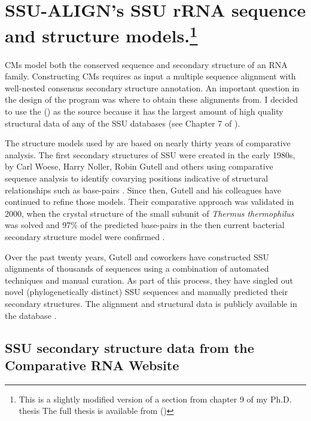 \section[SSU-ALIGN's SSU rRNA sequence and structure
  models]{SSU-ALIGN's SSU rRNA sequence and structure
  models.\footnote{This is a slightly modified version 
  of a section from chapter 9 of my Ph.D. thesis \cite{Nawrocki09b}
  The full thesis is available from
  ()}}
\label{sec:models}

CMs model both the conserved sequence and secondary structure of an
RNA family. Constructing CMs requires as input a multiple sequence
alignment with well-nested consensus secondary structure
annotation. An important question in the design of the 
program was where to obtain these alignments from. I decided to use
the  () \cite{CannoneGutell02} as
the source because it has the largest amount of high quality
structural data of any of the SSU databases (see
Chapter 7 of \cite{Nawrocki09b}).

The structure models used by  are based on nearly thirty years of
comparative analysis. The first secondary structures of SSU were
created in the early 1980s, by Carl Woese, Harry Noller, Robin Gutell
and others using comparative sequence analysis to identify covarying
positions indicative of structural relationships such as base-pairs
\cite{Woese80,Noller81,Woese83}. Since then, Gutell and his
colleagues have continued to refine those models. Their comparative
approach was validated in 2000, when the crystal structure of the
small subunit of \emph{Thermus thermophilus} was solved
\cite{Wimberly00} and 97\% of the predicted base-pairs in the then
current bacterial secondary structure model were confirmed
\cite{Gutell02}.

Over the past twenty years, Gutell and coworkers have constructed SSU
alignments of thousands of sequences using a combination of automated
techniques and manual curation. As part of this process, they have
singled out novel (phylogenetically distinct) SSU sequences and
manually predicted their secondary structures. The alignment and
structural data is publicly available in the  database
\cite{CannoneGutell02}. 

\subsection{SSU secondary structure data from the Comparative RNA
  Website} 

